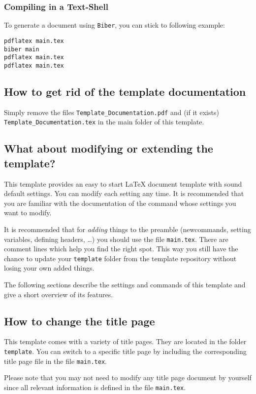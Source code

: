\subsubsection{Compiling in a Text-Shell}

To generate a document using \texttt{Biber}, you can stick to
following example:
\begin{verbatim}
pdflatex main.tex
biber main
pdflatex main.tex
pdflatex main.tex
\end{verbatim}




\subsection{How to get rid of the template documentation}

Simply remove the files \verb#Template_Documentation.pdf# and 
(if it exists)  \verb#Template_Documentation.tex# in the main folder 
of this template.

\subsection{What about modifying or extending the template?}\myinteresting
\label{sec:extending-template}

This template provides an easy to start \LaTeX{} document template with sound
default settings. You can modify each setting any time. It is recommended that
you are familiar with the documentation of the command whose settings you want
to modify.

It is recommended that for \emph{adding} things to the preamble (newcommands,
setting variables, defining headers, \dots) you should use the file
\texttt{main.tex}. 
There are comment lines which help you find the right spot.
This way you still have the chance to update your \texttt{template}
folder from the template repository without losing your own added things.

The following sections describe the settings and commands of this template and
give a short overview of its features.

\subsection{How to change the title page}

This template comes with a variety of title pages. They are located in
the folder \texttt{template}. You can switch to a specific title
page by including the corresponding title page file in the file
\texttt{main.tex}.

Please note that you may not need to modify any title page document by
yourself since all relevant information is defined in the file
\texttt{main.tex}.
